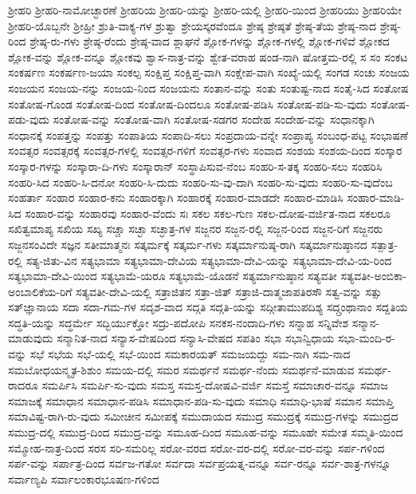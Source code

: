 {ಶ್ರೀಹರಿ
ಶ್ರೀಹರಿ-ನಾಮೋಚ್ಛಾರಣೆ
ಶ್ರೀಹರಿಯ
ಶ್ರೀಹರಿ-ಯನ್ನು
ಶ್ರೀಹರಿ-ಯಲ್ಲಿ
ಶ್ರೀಹರಿ-ಯಿಂದ
ಶ್ರೀಹರಿಯು
ಶ್ರೀಹರಿಯೇ
ಶ್ರೀಹರಿ-ಯೊಬ್ಬನೇ
ಶ್ರೀಹ್ರೀ
ಶ್ರುತಿ-ವಾಕ್ಯ-ಗಳ
ಶ್ರುತ್ವಾ
ಶ್ರೇಯಸ್ಕರವೆಂದೂ
ಶ್ರೇಷ್ಠ
ಶ್ರೇಷ್ಠತೆ
ಶ್ರೇಷ್ಠ-ತೆಯ
ಶ್ರೇಷ್ಠ-ನಾದ
ಶ್ರೇಷ್ಠ-ರಿಂದ
ಶ್ರೇಷ್ಠ-ರು-ಗಳು
ಶ್ರೇಷ್ಠ-ರೆಂದು
ಶ್ರೇಷ್ಠ-ವಾದ
ಶ್ಲಾಘನೆ
ಶ್ಲೋಕ-ಗಳನ್ನು
ಶ್ಲೋಕ-ಗಳಲ್ಲಿ
ಶ್ಲೋಕ-ಗಳಿವೆ
ಶ್ಲೋಕದ
ಶ್ಲೋಕ-ವನ್ನು
ಶ್ಲೋಕ-ವನ್ನೂ
ಶ್ಲೋಕವು
ಶ್ವಾಸ-ನಾತ್ರ-ವನ್ನು
ಶ್ವೇತ-ವರಾಹ
ಷಂಡ-ನಾಗಿ
ಷೋತ್ತಮ-ರಲ್ಲಿ
ಸ
ಸಂ
ಸಂಕಟ
ಸಂಕರ್ಷಣ
ಸಂಕರ್ಷಣ-ಜಯಾ
ಸಂಕಲ್ಪ
ಸಂಕ್ಷಿಪ್ತ
ಸಂಕ್ಷಿಪ್ತ-ವಾಗಿ
ಸಂಕ್ಷೇಪ-ವಾಗಿ
ಸಂಖ್ಯೆ-ಯಲ್ಲಿ
ಸಂಗಡ
ಸಂಚು
ಸಂಜಯ
ಸಂಜಯನ
ಸಂಜಯ-ನನ್ನು
ಸಂಜಯ-ನಿಂದ
ಸಂಜಯನು
ಸಂತಾನ-ವನ್ನು
ಸಂತು
ಸಂತುಷ್ಟ-ನಾದ
ಸಂತೈ-ಸಿದ
ಸಂತೋಷ
ಸಂತೋಷ-ಗೊಂಡ
ಸಂತೋಷ-ದಿಂದ
ಸಂತೋಷ-ದಿಂದಲೂ
ಸಂತೋಷ-ಪಡಿಸಿ
ಸಂತೋಷ-ಪಡಿ-ಸು-ವುದು
ಸಂತೋಷ-ಪಡು-ವುದು
ಸಂತೋಷ-ವನ್ನು
ಸಂತೋಷ-ವಾಗಿ
ಸಂತೋಷ-ಸಡಗರ
ಸಂದೇಹ
ಸಂದೇಹ-ವನ್ನು
ಸಂಧಾನಕ್ಕಾಗಿ
ಸಂಧಾನಕ್ಕೆ
ಸಂಪತ್ತನ್ನು
ಸಂಪತ್ತು
ಸಂಪಾತಿಯ
ಸಂಪಾದಿ-ಸಲು
ಸಂಪ್ರದಾಯ-ವನ್ನೇ
ಸಂಪ್ರಾಪ್ಯ
ಸಂಬಂಧ-ಪಟ್ಟ
ಸಂಭಾಷಣೆ
ಸಂವತ್ಸರ
ಸಂವತ್ಸರಕ್ಕೆ
ಸಂವತ್ಸರ-ಗಳಲ್ಲಿ
ಸಂವತ್ಸರ-ಗಳಿಗೆ
ಸಂವತ್ಸರ-ಗಳು
ಸಂವಾದ
ಸಂಶಯ
ಸಂಶಯ-ದಿಂದ
ಸಂಸ್ಕಾರ
ಸಂಸ್ಕಾರ-ಗಳನ್ನು
ಸಂಸ್ಕಾರಾ-ದಿ-ಗಳು
ಸಂಸ್ಕಾರಾನ್
ಸಂಸ್ಥಾಪಿಸುವ-ನೆಂಬ
ಸಂಹರಿ-ಸ-ತಕ್ಕ
ಸಂಹರಿ-ಸಲು
ಸಂಹರಿಸಿ
ಸಂಹರಿ-ಸಿದ
ಸಂಹರಿ-ಸಿ-ದನೋ
ಸಂಹರಿ-ಸಿ-ದುದು
ಸಂಹರಿ-ಸು-ವು-ದಾಗಿ
ಸಂಹರಿ-ಸು-ವುದು
ಸಂಹರಿ-ಸು-ವುದೆಂಬ
ಸಂಹರ್ತಾ
ಸಂಹಾರ
ಸಂಹಾರ-ಕನು
ಸಂಹಾರಕ್ಕಾಗಿ
ಸಂಹಾರಕ್ಕೆ
ಸಂಹಾರ-ಮಾಡದೇ
ಸಂಹಾರ-ಮಾಡಿಸಿ
ಸಂಹಾರ-ಮಾಡಿ-ಸಿದ
ಸಂಹಾರ-ವನ್ನು
ಸಂಹಾರವು
ಸಂಹಾರ-ವೆಂದು
ಸಃ
ಸಕಲ
ಸಕಲ-ಗುಣ
ಸಕಲ-ದೋಷ-ವರ್ಜಿತ-ನಾದ
ಸಕಲರೂ
ಸಖಿತ್ವಮಾಪ್ಯ
ಸಖಿಯ
ಸಖ್ಯ
ಸಚ್ಚಾ
ಸಚ್ಛಾ
ಸಚ್ಛಾತ್ರ-ಗಳ
ಸಜ್ಜನರ
ಸಜ್ಜನ-ರಲ್ಲಿ
ಸಜ್ಜನ-ರಿಂದ
ಸಜ್ಜನ-ರಿಗೆ
ಸಜ್ಜನರು
ಸಜ್ಜನಸಂವಿದೇ
ಸಜ್ಞನ
ಸತೀಮಾತ್ಮನಃ
ಸತ್ಕರ್ಮಕ್ಕೆ
ಸತ್ಕರ್ಮ-ಗಳು
ಸತ್ಕರ್ಮಾನುಷ್ಠ-ರಾಗಿ
ಸತ್ಕರ್ಮಾನುಷ್ಠಾನದ
ಸತ್ಪಾತ್ರ-ರಲ್ಲಿ
ಸತ್ಯ-ಜಿತು-ವಿನ
ಸತ್ಯಭಾಮಾ
ಸತ್ಯಭಾಮಾ-ದೇವಿಯ
ಸತ್ಯಭಾಮಾ-ದೇವಿ-ಯನ್ನು
ಸತ್ಯಭಾಮಾ-ದೇವಿ-ಯ-ರಿಂದ
ಸತ್ಯಭಾಮಾ-ದೇವಿ-ಯಿಂದ
ಸತ್ಯಭಾಮೆ-ಯರೂ
ಸತ್ಯಭಾಮೆ-ಯೊಡನೆ
ಸತ್ಯರ್ಮಾನುಷ್ಠಾನ
ಸತ್ಯವತೀ
ಸತ್ಯವತೀ-ಅಂಬಿಕಾ-ಅಂಬಾಲಿಕೆಯ-ರಿಗೆ
ಸತ್ಯವತೀ-ದೇವಿ-ಯಲ್ಲಿ
ಸತ್ರಾಜಿತನ
ಸತ್ರಾ-ಜಿತ್
ಸತ್ರಾಜಿ-ದಾತ್ಮಜಾಪತಿರಸೌ
ಸತ್ವ-ವನ್ನು
ಸತ್ಸು
ಸತ್‌ಜ್ಞಾನಾಯ
ಸದಾ
ಸದಾ-ಗಮ-ಗಳ
ಸದೃಶ-ವಾದ
ಸದ್ಗತಿ
ಸದ್ಗತಿ-ಯನ್ನು
ಸದ್ಗೀತಾಮುಪದಿಶ್ಯ
ಸದ್ಗ್ರಂಥಾನಾಂ
ಸದ್ದತಿಯ
ಸದ್ಧತಿ-ಯನ್ನು
ಸದ್ಧರ್ಮೇ
ಸದ್ಭಿರ್ಯುಕ್ತೋ
ಸದ್ರು-ಪದೋಪಿ
ಸನಕಸ-ನಂದಾದಿ-ಗಳು
ಸನ್ನಾಹ
ಸನ್ನಿವೇಶ
ಸನ್ಮಾನ-ಮಾಡುವುದು
ಸನ್ಮಾನಿತ-ನಾದ
ಸನ್ಯಾಸ-ವೇಷದಿಂದ
ಸನ್ಯಾಸಿ-ವೇಷದ
ಸಪತಿಂ
ಸಭಾ
ಸಭಾನ್ವಿಧಾಯ
ಸಭಾ-ಮಂದಿ-ರ-ವನ್ನು
ಸಭೆ
ಸಭೆಯ
ಸಭೆ-ಯಲ್ಲಿ
ಸಭೆ-ಯಿಂದ
ಸಮಕಾರಯತ್‌
ಸಮಜಯದ್ದು
ಸಮ-ನಾಗಿ
ಸಮ-ನಾದ
ಸಮಬೋಧಯನ್ಮೃತ-ಶಿಶುಂ
ಸಮಯ-ದಲ್ಲಿ
ಸಮರ
ಸಮರ್ಥನೆ
ಸಮರ್ಥ-ನೆಂದು
ಸಮರ್ಥನೆ-ಮಾಡುವ
ಸಮರ್ಥ-ರಾದರೂ
ಸಮರ್ಪಿಸಿ
ಸಮರ್ಪಿ-ಸು-ವುದು
ಸಮಸ್ತ
ಸಮಸ್ತ-ದೋಷವಿ-ವರ್ಜಿ
ಸಮಸ್ತೆ
ಸಮಾಚಾರ-ವನ್ನೂ
ಸಮಾಜ
ಸಮಾಜಕ್ಕೆ
ಸಮಾಧಾನ
ಸಮಾಧಾನ-ಪಡಿಸಿ
ಸಮಾಧಾನ-ಪಡಿ-ಸು-ವುದು
ಸಮಾಧಿ
ಸಮಾಧಿ-ಭಾಷೆ
ಸಮಾನ
ಸಮಾಪ್ತಿ
ಸಮಾವಿಷ್ಟ-ರಾಗಿ-ರು-ವುದು
ಸಮೀಚೀನ
ಸಮೀಪಕ್ಕೆ
ಸಮುದಾಯದ
ಸಮುದ್ರ
ಸಮುದ್ರಕ್ಕೆ
ಸಮುದ್ರ-ಗಳನ್ನು
ಸಮುದ್ರದ
ಸಮುದ್ರ-ದಲ್ಲಿ
ಸಮುದ್ರ-ದಿಂದ
ಸಮುದ್ರ-ವನ್ನು
ಸಮೂಹ-ದಿಂದ
ಸಮೂಹ-ವನ್ನು
ಸಮೂಹೇ
ಸಮೇತ
ಸಮ್ಮತಿ-ಯಿಂದ
ಸಮ್ಮೋಹ-ನಾತ್ರ-ದಿಂದ
ಸರಸ
ಸರಿ-ಸಮರಿಲ್ಲ
ಸರೋ-ವರದ
ಸರೋ-ವರ-ದಲ್ಲಿ
ಸರೋ-ವರ-ವನ್ನು
ಸರ್ಪ-ಗಳಿಂದ
ಸರ್ಪ-ವನ್ನು
ಸರ್ಪಾತ್ರ-ದಿಂದ
ಸರ್ವಜ-ಗತೋ
ಸರ್ವದಾ
ಸರ್ವಪ್ರಯತ್ನ-ವನ್ನೂ
ಸರ್ವ-ರನ್ನೂ
ಸರ್ವ-ಶಾತ್ರ-ಗಳನ್ನೂ
ಸರ್ವಾಣ್ಯಪಿ
ಸರ್ವಾಲಂಕಾರಭೂಷಣ-ಗಳಿಂದ
}
